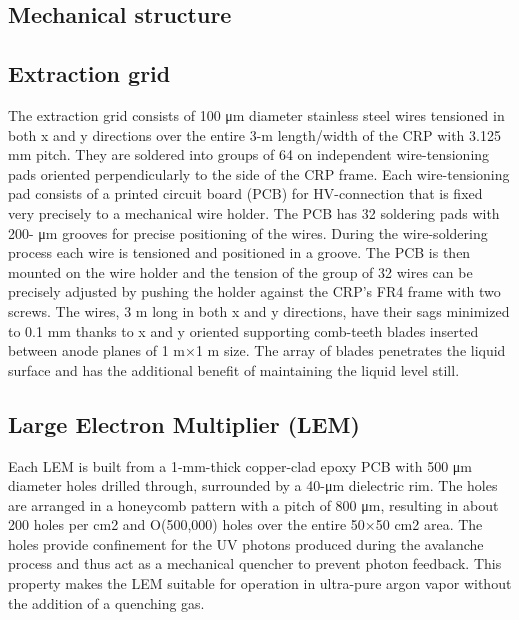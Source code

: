 \subsection{Mechanical structure}
\label{sec:fddp-crp-mechanics}

\subsection{Extraction grid}
\label{sec:fddp-crp-grid}
The extraction grid consists of 100 μm diameter stainless steel wires tensioned in both x and y directions over the entire 3-m length/width of the CRP with 3.125 mm pitch. They are soldered into groups of 64 on independent wire-tensioning pads oriented perpendicularly to the side of the CRP frame. Each wire-tensioning pad consists of a printed circuit board (PCB) for HV-connection that is fixed very precisely to a mechanical wire holder. The PCB has 32 soldering pads with 200- μm grooves for precise positioning of the wires. During the wire-soldering process each wire is tensioned and positioned in a groove. The PCB is then mounted on the wire holder and the tension of the group of 32 wires
can be precisely adjusted by pushing the holder against the CRP’s FR4 frame with two screws. The wires, 3 m long in both x and y directions, have their sags minimized to 0.1 mm thanks to x and y oriented supporting comb-teeth blades  inserted between anode planes of 1 m×1 m size. The array of blades penetrates the liquid surface and has the additional benefit of maintaining the liquid level still.

\subsection{Large Electron Multiplier (LEM)}
\label{sec:fddp-crp-lem}
Each LEM is built from a 1-mm-thick copper-clad epoxy PCB with 500 μm diameter holes drilled through, surrounded by a 40-μm dielectric rim. The holes are arranged in a honeycomb pattern with a pitch of 800 μm, resulting in about 200 holes per cm2
and O(500,000) holes over the entire 50×50 cm2 area. The holes provide confinement for the UV photons produced during the avalanche process and thus act as a mechanical quencher to prevent photon feedback. This property makes the LEM suitable for operation in ultra-pure argon vapor without the addition of a quenching gas.


